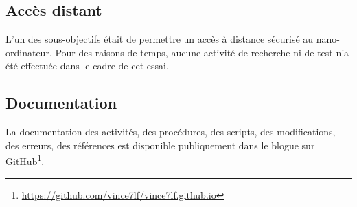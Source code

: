 \subsection{Accès distant}
\noindent L'un des sous-objectifs était de permettre un accès à distance sécurisé au nano-ordinateur. Pour des raisons de temps, aucune activité de recherche ni de test n'a été effectuée dans le cadre de cet essai. 
\subsection{Documentation}
\noindent La documentation des activités, des procédures, des scripts, des modifications, des erreurs, des références est disponible publiquement dans le blogue sur GitHub\footnote{\url{https://github.com/vince7lf/vince7lf.github.io}}.